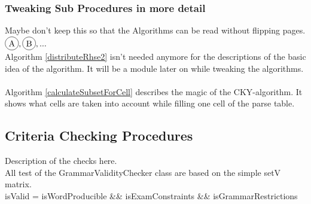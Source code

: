 \subsubsection{Tweaking Sub Procedures in more detail}
Maybe don't keep this so that the Algorithms can be read without flipping pages.\\
$\circled{A}, \circled{B}, ...$\\
\noindent
{}
Algorithm \ref{distributeRhse2} isn't needed anymore for the descriptions of the basic idea of the algorithm. It will be a module later on while tweaking the algorithms.
\\
\\
Algorithm \ref{calculateSubsetForCell} describes the magic of the CKY-algorithm. It shows what cells are taken into account while filling one cell of the parse table.

\pagebreak

\subsection{Criteria Checking Procedures}
\noindent Description of the checks here. \\
\noindent All test of the GrammarValidityChecker class are based on the simple setV matrix. \\

\noindent  isValid = isWordProducible \&\& isExamConstraints \&\& isGrammarRestrictions\\

